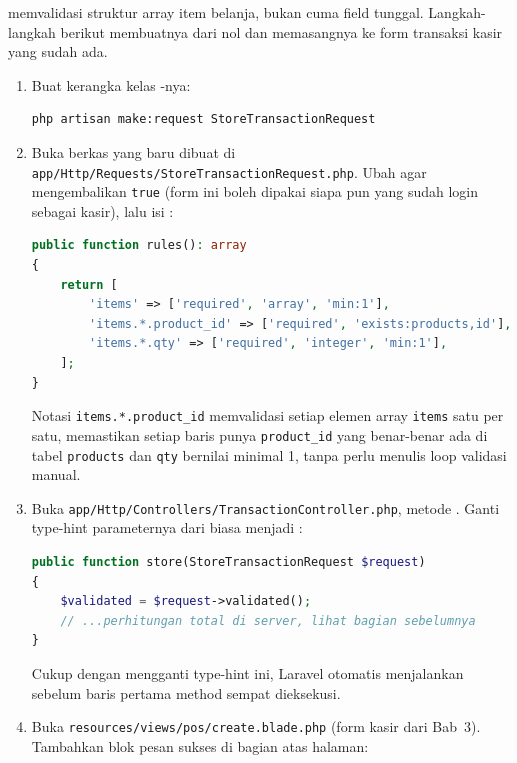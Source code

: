  memvalidasi struktur array item
belanja, bukan cuma field tunggal. Langkah-langkah berikut membuatnya
dari nol dan memasangnya ke form transaksi kasir yang sudah ada.

\begin{enumerate}
  \item Buat kerangka kelas -nya:
    \begin{lstlisting}[language=bash]
php artisan make:request StoreTransactionRequest
    \end{lstlisting}
  \item Buka berkas yang baru dibuat di
    \texttt{app/Http\allowbreak/Requests\allowbreak/StoreTransactionRequest.php}. Ubah
     agar mengembalikan \texttt{true} (form ini boleh
    dipakai siapa pun yang sudah login sebagai kasir), lalu isi
    :
    \begin{lstlisting}[language=php, title=\lstfile{app/Http/Requests/StoreTransactionRequest.php}]
public function rules(): array
{
    return [
        'items' => ['required', 'array', 'min:1'],
        'items.*.product_id' => ['required', 'exists:products,id'],
        'items.*.qty' => ['required', 'integer', 'min:1'],
    ];
}
    \end{lstlisting}
    Notasi \texttt{items.*.product\_id} memvalidasi setiap elemen array
    \texttt{items} satu per satu, memastikan setiap baris punya
    \texttt{product\_id} yang benar-benar ada di tabel \texttt{products}
    dan \texttt{qty} bernilai minimal 1, tanpa perlu menulis loop
    validasi manual.
  \item Buka \texttt{app/Http/Controllers/TransactionController.php},
    metode . Ganti type-hint parameternya dari
     biasa menjadi :
    \begin{lstlisting}[language=php, title=\lstfile{app/Http/Controllers/TransactionController.php}]
public function store(StoreTransactionRequest $request)
{
    $validated = $request->validated();
    // ...perhitungan total di server, lihat bagian sebelumnya
}
    \end{lstlisting}
    Cukup dengan mengganti type-hint ini, Laravel otomatis menjalankan
     sebelum baris pertama method  sempat
    dieksekusi.
  \item Buka \texttt{resources/views/pos/create.blade.php} (form kasir
    dari Bab~3). Tambahkan blok pesan sukses di bagian atas halaman:
    \begin{lstlisting}[language=php, title=\lstfile{resources/views/pos/create.blade.php}]

\end{lstlisting}
\end{enumerate}
